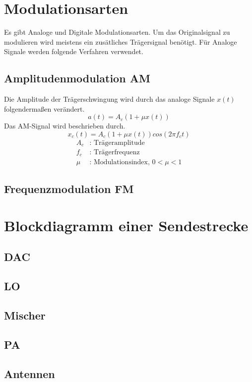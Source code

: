 \section{Modulationsarten}
Es gibt Analoge und Digitale Modulationsarten.
Um das Originalsignal zu modulieren wird meistens ein zusätliches Trägersignal benötigt.
Für Analoge Signale werden folgende Verfahren verwendet.

\subsection{Amplitudenmodulation AM}
Die Amplitude der Trägerschwingung wird durch das analoge Signale
$x(t)$ folgendermaßen verändert.
\begin{equation}
    a(t)=A_c(1+\mu x(t))
\end{equation}
Das AM-Signal wird beschrieben durch.
\begin{equation}
    x_c(t)=A_c(1+\mu x(t))cos(2\pi f_c t)
\end{equation}
\begin{align}
    A_c &\text{: Trägeramplitude} \\
    f_c &\text{: Trägerfrequenz} \\
    \mu &\text{: Modulationsindex, } 0 < \mu < 1
\end{align}


\subsection{Frequenzmodulation FM}

\section{Blockdiagramm einer Sendestrecke}
\subsection{DAC}
\subsection{LO}
\subsection{Mischer} 
\subsection{PA}
\subsection{Antennen}
